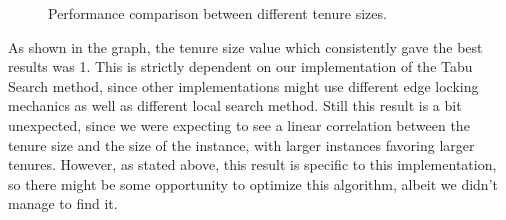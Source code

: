 \begin{figure}[htbp]
	\centering
	\caption{Performance comparison between different tenure sizes.} \label{fig:tabuParmTune}
\end{figure}

As shown in the graph, the tenure size value which consistently gave the best results was 1.
This is strictly dependent on our implementation of the Tabu Search method, since other implementations might use different edge locking mechanics as well as different local search method.
Still this result is a bit unexpected, since we were expecting to see a linear correlation between the tenure size and the size of the instance, with larger instances favoring larger tenures.
However, as stated above, this result is specific to this implementation, so there might be some opportunity to optimize this algorithm, albeit we didn't manage to find it.

